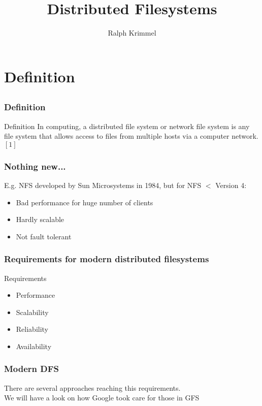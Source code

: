 \documentclass[notes=hide,yellow]{beamer}
\title{ Distributed Filesystems}
\subtitle{ }
\author{Ralph Krimmel}
\begin{document}
	\begin{frame}
		\titlepage
	\end{frame}

	\begin{frame}
		\tableofcontents
	\end{frame}

\section{Definition}
\subsection*{}
\begin{frame}
\frametitle{Definition}
	\begin{block}{Definition}
		In computing, a distributed file system or network file system is any file system that allows access to files from multiple hosts via a computer network.$[1]$
	\end{block}
\end{frame}

\begin{frame}
\frametitle{Nothing new...}

		E.g. NFS developed by Sun Microsystems in 1984, but for NFS $<$ Version 4:
		
		\begin{itemize}
			\item Bad performance for huge number of clients 
			\item Hardly scalable
			\item Not fault tolerant
		\end{itemize}
\end{frame}

\begin{frame}
	\frametitle{Requirements for modern distributed filesystems}
	\begin{block}{Requirements}
	\begin{itemize}
		\item Performance
		\item Scalability
		\item Reliability
		\item Availability
	\end{itemize}
	\end{block}
\end{frame}

\begin{frame}
	\frametitle{Modern DFS}
	There are several approaches reaching this requirements. \\
	We will have a look on how Google took care for those in GFS	
\end{frame}
\end{document}
